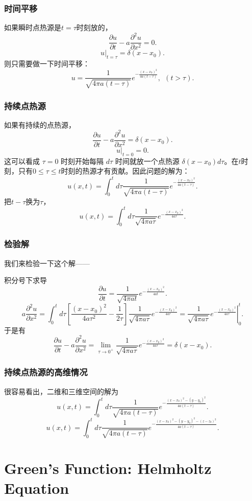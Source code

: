 \documentclass[CJK]{beamer}
\begin{document}
\begin{frame}
  \frametitle{时间平移}
  如果瞬时点热源是$t=\tau$时刻放的，
  $$\frac{\partial u}{\partial t} - a\frac{\partial^2 u}{\partial x^2}=0.$$
  $$\left. u \right\vert_{t=\tau}= \delta(x-x_0).$$
  则只需要做一下时间平移：
  $$ u  = \frac{1}{\sqrt{4\pi a(t-\tau)}} e^{-\frac{(x-x_0)^2}{4a(t-\tau)}},\ \  (t>\tau).$$
\end{frame}


\begin{frame}
  \frametitle{持续点热源}
  如果有持续的点热源，
  $$\frac{\partial u}{\partial t} - a\frac{\partial^2 u}{\partial x^2}=\delta(x-x_0).$$
  $$\left. u \right\vert_{t=0}=0.$$
  这可以看成 $\tau=0$ 时刻开始每隔 $d\tau$ 时间就放一个点热源 $\delta(x-x_0)d\tau$。在$t$时刻，只有$0\le \tau\le t$时刻的热源才有贡献。因此问题的解为：
  $$ u(x,t) = \int_0^t d\tau  \frac{1}{\sqrt{4\pi a(t-\tau)}} e^{-\frac{(x-x_0)^2}{4a(t-\tau)}}.$$
  把$t-\tau$换为$\tau$，
  $$ u(x,t) = \int_0^t d\tau  \frac{1}{\sqrt{4\pi a\tau}} e^{-\frac{(x-x_0)^2}{4a\tau}}.$$
\end{frame}


\begin{frame}
  \frametitle{检验解}
  我们来检验一下这个解——
  
  积分号下求导
  $$\frac{\partial u}{\partial t}= \frac{1}{\sqrt{4\pi at}} e^{-\frac{(x-x_0)^2}{4at}}.$$
  $$a\frac{\partial^2 u}{\partial x^2} = \int_0^t d\tau  \left[\frac{(x-x_0)^2}{4a\tau^2}-\frac{1}{2\tau} \right]\frac{1}{\sqrt{4\pi a\tau}} e^{-\frac{(x-x_0)^2}{4a\tau}} = \left.\frac{1}{\sqrt{4\pi a\tau}} e^{-\frac{(x-x_0)^2}{4a\tau}} \right\vert_0^t.$$
  于是有
  $$\frac{\partial u}{\partial t} - a\frac{\partial^2 u}{\partial x^2}= \lim_{\tau\rightarrow 0^+}\frac{1}{\sqrt{4\pi a\tau}} e^{-\frac{(x-x_0)^2}{4a\tau}} = \delta(x-x_0).$$
\end{frame}



\begin{frame}
  \frametitle{持续点热源的高维情况}
  很容易看出，二维和三维空间的解为
  $$ u(x,t) = \int_0^t d\tau  \frac{1}{\sqrt{4\pi a(t-\tau)}} e^{-\frac{(x-x_0)^2-(y-y_0)^2}{4a(t-\tau)}}.$$
  $$ u(x,t) = \int_0^t d\tau  \frac{1}{\sqrt{4\pi a(t-\tau)}} e^{-\frac{(x-x_0)^2-(y-y_0)^2-(z-z_0)^2}{4a(t-\tau)}}.$$
  
\end{frame}


\section{Green's Function: Helmholtz Equation}
\end{document}
